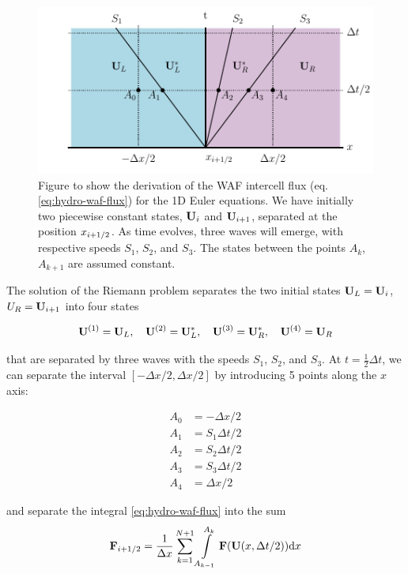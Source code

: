 \begin{figure}[htbp]
	\includegraphics[width=\textwidth]{./figures/WAF-hydro.pdf}%
	\caption{Figure to show the derivation of the WAF intercell flux (eq. \ref{eq:hydro-waf-flux}) for the 1D Euler equations.
		We have initially two piecewise constant states, $\mathbf{U}_i$ and $\mathbf{U}_{i+1}$, separated at the position $x_{i+1/2}$.
		As time evolves, three waves will emerge, with respective speeds $S_1$, $S_2$, and $S_3$.
		The states between the points $A_k$, $A_{k+1}$ are assumed constant.
		\label{fig:hydro-waf}
	}
\end{figure}



The solution of the Riemann problem separates the two initial states $\mathbf{U}_L = \mathbf{U}_i$, $U_R = \mathbf{U}_{i+1}$ into four states

\begin{align*}
	\mathbf{U}^{(1)} = \mathbf{U}_L, \quad	\mathbf{U}^{(2)} = \mathbf{U}_L^*, \quad	\mathbf{U}^{(3)} = \mathbf{U}_R^*, \quad	\mathbf{U}^{(4)} = \mathbf{U}_R
\end{align*}

that are separated by three waves with the speeds $S_1$, $S_2$, and $S_3$.
At $t = \frac{1}{2} \Delta t$, we can separate the interval $[-\Delta x /2, \Delta x /2]$ by introducing 5 points along the $x$ axis:

\begin{align*}
	A_0 &= - \Delta x / 2\\
	A_1 &= S_1 \Delta t / 2\\
	A_2 &= S_2 \Delta t / 2\\
	A_3 &= S_3 \Delta t / 2\\
	A_4 &= \Delta x / 2
\end{align*}

and separate the integral \ref{eq:hydro-waf-flux} into the sum
\begin{align}
\F_{i + \half} = \frac{1}{\Delta x} \sum\limits_{k = 1}^{N+1} \int\limits_{A_{k-1}}^{A_k} \F (\U(x, \Delta t / 2)) \de x
\end{align}

